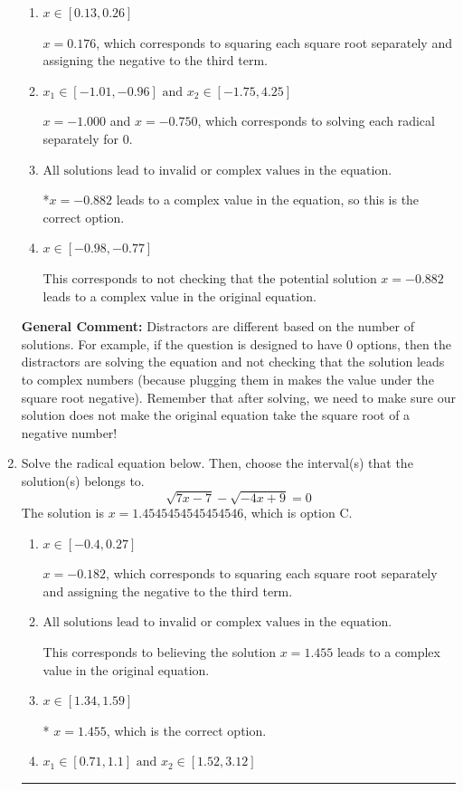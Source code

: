 \documentclass{extbook}[14pt]
\newcommand{\litem}[1]{\item #1

\rule{\textwidth}{0.4pt}}
\begin{document}
\begin{enumerate}
{\begin{enumerate}[label=\Alph*.]
$x = -0.882$ and $x = -0.750$, which corresponds to solving the equation correctly and including the value that makes the first square root 0.
\item \( x \in [0.13,0.26] \)

$x = 0.176$, which corresponds to squaring each square root separately and assigning the negative to the third term.
\item \( x_1 \in [-1.01, -0.96] \text{ and } x_2 \in [-1.75,4.25] \)

$x = -1.000$ and $x = -0.750$, which corresponds to solving each radical separately for 0.
\item \( \text{All solutions lead to invalid or complex values in the equation.} \)

*$x = -0.882$ leads to a complex value in the equation, so this is the correct option.
\item \( x \in [-0.98,-0.77] \)

This corresponds to not checking that the potential solution $x = -0.882$ leads to a complex value in the original equation.
\end{enumerate}

\textbf{General Comment:} Distractors are different based on the number of solutions. For example, if the question is designed to have 0 options, then the distractors are solving the equation and not checking that the solution leads to complex numbers (because plugging them in makes the value under the square root negative). Remember that after solving, we need to make sure our solution does not make the original equation take the square root of a negative number!
}
\litem{
Solve the radical equation below. Then, choose the interval(s) that the solution(s) belongs to.
\[ \sqrt{7 x - 7} - \sqrt{-4 x + 9} = 0 \]The solution is \( x = 1.4545454545454546 \), which is option C.\begin{enumerate}[label=\Alph*.]
\item \( x \in [-0.4,0.27] \)

$x = -0.182$, which corresponds to squaring each square root separately and assigning the negative to the third term.
\item \( \text{All solutions lead to invalid or complex values in the equation.} \)

This corresponds to believing the solution $x = 1.455$ leads to a complex value in the original equation.
\item \( x \in [1.34,1.59] \)

* $x = 1.455$, which is the correct option.
\item \( x_1 \in [0.71, 1.1] \text{ and } x_2 \in [1.52,3.12] \)


\end{enumerate}}
\end{enumerate}
\end{document}
